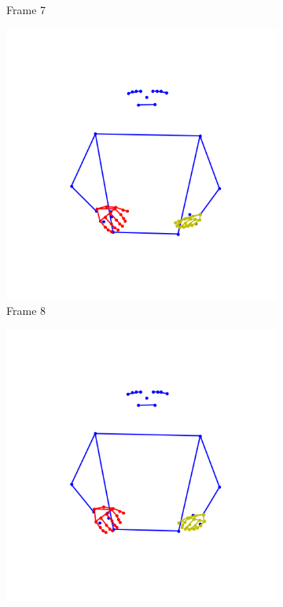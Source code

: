 \begin{figure}[t]
\begin{subfigure}[t]{0.3\textwidth}
		\caption{Frame 7}
		\label{f:frame7}
	\end{subfigure}
	\begin{subfigure}[t]{0.3\textwidth}
	\centering
		\includegraphics[align=t,width=0.9\linewidth, height =0.9\linewidth]{Graphics/interpol_aborto_amar_8.png}
		\caption{Frame 8}
		\label{f:frame8}
	\end{subfigure}
	\vskip 0pt
	\begin{subfigure}[t]{0.3\textwidth}
	\centering
		\includegraphics[align=t,width=0.9\linewidth, height =0.9\linewidth]{Graphics/interpol_aborto_amar_9.png}

\end{subfigure}
\end{figure}

